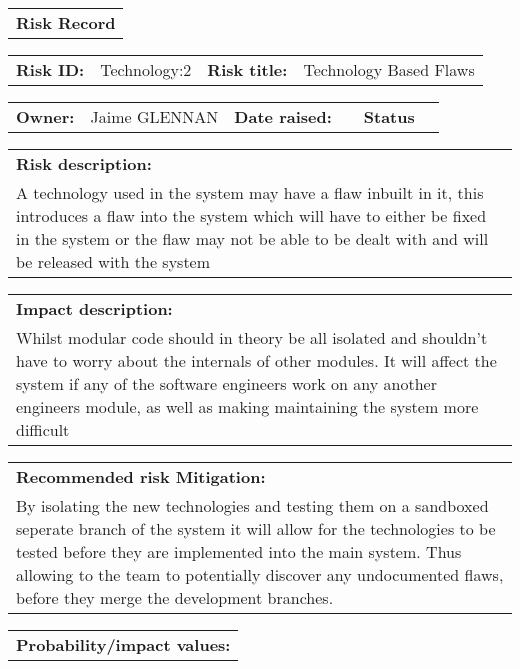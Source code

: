 \begin{table}
	\begin{tabularx}{\textwidth}{| X |}
		\hline
		\textbf{Risk Record}
	\end{tabularx}
	\begin{tabularx}{\textwidth}{| l | X | l | X |}
		\hline
		\textbf{Risk ID:} & Technology:2 & \textbf{Risk title:} & Technology Based Flaws \\
	\end{tabularx}
	\begin{tabularx}{\textwidth}{| l | X | l | X | l | X |}
		\hline
		\textbf{Owner:} & Jaime GLENNAN & \textbf{Date raised:} &  & \textbf{Status} &  \\
	\end{tabularx}
	\begin{tabularx}{\textwidth}{| X |}
		\hline
		\textbf{Risk description:} \\ A technology used in the system may have a flaw inbuilt in it, this introduces a flaw into the system which will have to either be fixed in the system or the flaw may not be able to be dealt with and will be released with the system \\
	\end{tabularx}
	\begin{tabularx}{\textwidth}{| X |}
		\hline
		\textbf{Impact description:} \\ Whilst modular code should in theory be all isolated and shouldn't have to worry about the internals of other modules. It will affect the system if any of the software engineers work on any another engineers module, as well as making maintaining the system more difficult \\
	\end{tabularx}
	\begin{tabularx}{\textwidth}{| X |}
		\hline
		\textbf{Recommended risk Mitigation:} \\ By isolating the new technologies and testing them on a sandboxed seperate branch of the system it will allow for the technologies to be tested before they are implemented into the main system. Thus allowing to the team to potentially discover any undocumented flaws, before they merge the development branches. \\
	\end{tabularx}
	\begin{tabularx}{\textwidth}{| X |}
		\hline
		\textbf{Probability/impact values:} \\
	\end{tabularx}

\end{table}

